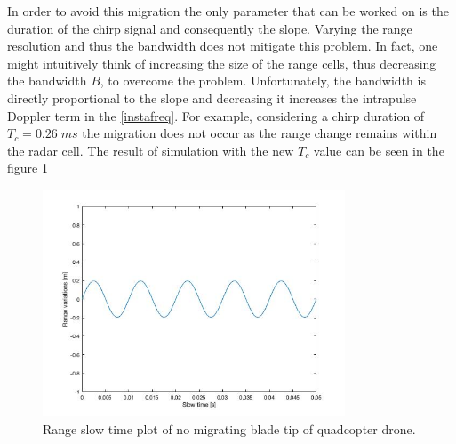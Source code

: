 In order to avoid this migration the only parameter that can be worked on is the duration of the chirp signal and consequently the slope. Varying the range resolution and thus the bandwidth does not mitigate this problem. In fact, one might intuitively think of increasing the size of the range cells, thus decreasing the bandwidth $B$, to overcome the problem. Unfortunately, the bandwidth is directly proportional to the slope and decreasing it increases the intrapulse Doppler term in the \ref{instafreq}. For example, considering a chirp duration of $T_c = 0.26\;ms$ the migration does not occur as the range change remains within the radar cell. The result of simulation with the new  $T_c$ value can be seen in the figure \ref{no-migration-quad-plot}
\begin{figure}[h!]
    \centering
    \includegraphics[width=9cm]{Time-frequency analysis-chap3/img/squad_range-slow-time_plot_no_migr.jpg}
    \caption{Range slow time plot of no migrating blade tip of quadcopter drone.}
    \label{no-migration-quad-plot}
\end{figure}

